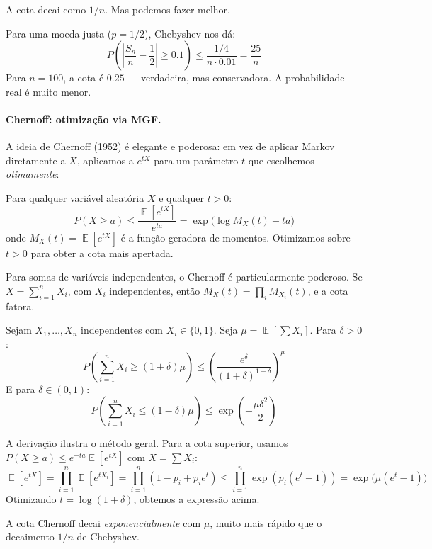 \documentclass{tufte-handout}
\DeclareMathOperator{\E}{\mathbb{E}}
\begin{document}
A cota decai como $1/n$. Mas podemos fazer melhor.

\begin{exmp}
    Para uma moeda justa ($p = 1/2$), Chebyshev nos dá:
    \[
    P\left(\left|\frac{S_n}{n} - \frac12\right| \ge 0.1\right) \le \frac{1/4}{n \cdot 0.01} = \frac{25}{n}
    \]
    Para $n = 100$, a cota é $0.25$ --- verdadeira, mas conservadora. A probabilidade real é muito menor.
\end{exmp}

\paragraph{Chernoff: otimização via MGF.}

A ideia de Chernoff (1952) é elegante e poderosa: em vez de aplicar Markov diretamente a $X$, aplicamos a $e^{tX}$ para um parâmetro $t$ que escolhemos \textit{otimamente}:

\begin{thm}
    Para qualquer variável aleatória $X$ e qualquer $t > 0$:
    \[
    P(X \ge a) \le \frac{\E[e^{tX}]}{e^{ta}} = \exp\!\big(\log M_X(t) - ta\big)
    \]
    onde $M_X(t) = \E[e^{tX}]$ é a função geradora de momentos.
    Otimizamos sobre $t > 0$ para obter a cota mais apertada.
\end{thm}

Para somas de variáveis independentes, o Chernoff é particularmente poderoso. Se $X = \sum_{i=1}^n X_i$, com $X_i$ independentes, então $M_X(t) = \prod_i M_{X_i}(t)$, e a cota fatora.

\begin{thm}
    Sejam $X_1, \dots, X_n$ independentes com $X_i \in \{0,1\}$. Seja $\mu = \E[\sum X_i]$. Para $\delta > 0$:
    \[
    P\!\left(\sum_{i=1}^n X_i \ge (1+\delta)\mu\right) \le \left(\frac{e^\delta}{(1+\delta)^{1+\delta}}\right)^\mu
    \]
    E para $\delta \in (0,1)$:
    \[
    P\!\left(\sum_{i=1}^n X_i \le (1-\delta)\mu\right) \le \exp\!\left(-\frac{\mu\delta^2}{2}\right)
    \]
\end{thm}

A derivação ilustra o método geral. Para a cota superior, usamos $P(X \ge a) \le e^{-ta} \E[e^{tX}]$ com $X = \sum X_i$:
\[
\E[e^{tX}] = \prod_{i=1}^n \E[e^{tX_i}] = \prod_{i=1}^n (1 - p_i + p_i e^t) \le \prod_{i=1}^n \exp(p_i(e^t - 1)) = \exp\!\big(\mu(e^t - 1)\big)
\]
Otimizando $t = \log(1+\delta)$, obtemos a expressão acima.

A cota Chernoff decai \textit{exponencialmente} com $\mu$, muito mais rápido que o decaimento $1/n$ de Chebyshev.
\end{document}
